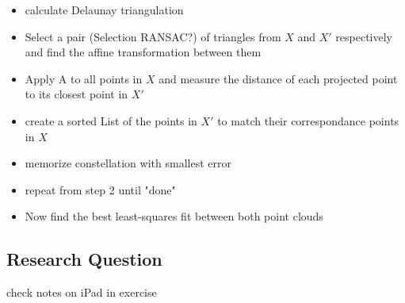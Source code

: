 \begin{itemize}
	\item calculate Delaunay triangulation
	\item Select a pair (Selection RANSAC?) of triangles from $X$ and $X'$ respectively and find the affine transformation between them
	\item Apply A to all points in $X$ and measure the distance of each projected point to its closest point in $X'$
	\item create a sorted List of the points in $X'$ to match their correspondance points in $X$
	\item memorize constellation with smallest error
	\item repeat from step 2 until "done"
	\item Now find the best least-squares fit between both point clouds
\end{itemize}

\subsection{Research Question}
check notes on iPad in exercise 